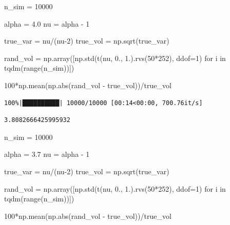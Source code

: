 \documentclass[
  letterpaper,
]{report}
\newenvironment{Shaded}{\begin{snugshade}}{\end{snugshade}}
\newcommand{\BuiltInTok}[1]{\textcolor[rgb]{0.00,0.23,0.31}{#1}}
\newcommand{\ControlFlowTok}[1]{\textcolor[rgb]{0.00,0.23,0.31}{#1}}
\newcommand{\DecValTok}[1]{\textcolor[rgb]{0.68,0.00,0.00}{#1}}
\newcommand{\FloatTok}[1]{\textcolor[rgb]{0.68,0.00,0.00}{#1}}
\newcommand{\KeywordTok}[1]{\textcolor[rgb]{0.00,0.23,0.31}{#1}}
\newcommand{\NormalTok}[1]{\textcolor[rgb]{0.00,0.23,0.31}{#1}}
\newcommand{\OperatorTok}[1]{\textcolor[rgb]{0.37,0.37,0.37}{#1}}
\begin{document}
\begin{Shaded}
\begin{Highlighting}[]
\NormalTok{n\_sim }\OperatorTok{=} \DecValTok{10000}

\NormalTok{alpha }\OperatorTok{=} \FloatTok{4.0}
\NormalTok{nu }\OperatorTok{=}\NormalTok{ alpha }\OperatorTok{{-}} \DecValTok{1}

\NormalTok{true\_var }\OperatorTok{=}\NormalTok{ nu}\OperatorTok{/}\NormalTok{(nu}\OperatorTok{{-}}\DecValTok{2}\NormalTok{)}
\NormalTok{true\_vol }\OperatorTok{=}\NormalTok{ np.sqrt(true\_var)}

\NormalTok{rand\_vol }\OperatorTok{=}\NormalTok{ np.array([np.std(t(nu, }\FloatTok{0.}\NormalTok{, }\FloatTok{1.}\NormalTok{).rvs(}\DecValTok{50}\OperatorTok{*}\DecValTok{252}\NormalTok{), ddof}\OperatorTok{=}\DecValTok{1}\NormalTok{) }\ControlFlowTok{for}\NormalTok{ i }\KeywordTok{in}\NormalTok{ tqdm(}\BuiltInTok{range}\NormalTok{(n\_sim))])}

\DecValTok{100}\OperatorTok{*}\NormalTok{np.mean(np.}\BuiltInTok{abs}\NormalTok{(rand\_vol }\OperatorTok{{-}}\NormalTok{ true\_vol))}\OperatorTok{/}\NormalTok{true\_vol}
\end{Highlighting}
\end{Shaded}

\begin{verbatim}
100%|██████████| 10000/10000 [00:14<00:00, 700.76it/s]
\end{verbatim}

\begin{verbatim}
3.8082666425995932
\end{verbatim}

\begin{Shaded}
\begin{Highlighting}[]
\NormalTok{n\_sim }\OperatorTok{=} \DecValTok{10000}

\NormalTok{alpha }\OperatorTok{=} \FloatTok{3.7}
\NormalTok{nu }\OperatorTok{=}\NormalTok{ alpha }\OperatorTok{{-}} \DecValTok{1}

\NormalTok{true\_var }\OperatorTok{=}\NormalTok{ nu}\OperatorTok{/}\NormalTok{(nu}\OperatorTok{{-}}\DecValTok{2}\NormalTok{)}
\NormalTok{true\_vol }\OperatorTok{=}\NormalTok{ np.sqrt(true\_var)}

\NormalTok{rand\_vol }\OperatorTok{=}\NormalTok{ np.array([np.std(t(nu, }\FloatTok{0.}\NormalTok{, }\FloatTok{1.}\NormalTok{).rvs(}\DecValTok{50}\OperatorTok{*}\DecValTok{252}\NormalTok{), ddof}\OperatorTok{=}\DecValTok{1}\NormalTok{) }\ControlFlowTok{for}\NormalTok{ i }\KeywordTok{in}\NormalTok{ tqdm(}\BuiltInTok{range}\NormalTok{(n\_sim))])}

\DecValTok{100}\OperatorTok{*}\NormalTok{np.mean(np.}\BuiltInTok{abs}\NormalTok{(rand\_vol }\OperatorTok{{-}}\NormalTok{ true\_vol))}\OperatorTok{/}\NormalTok{true\_vol}
\end{Highlighting}
\end{Shaded}
\end{document}
